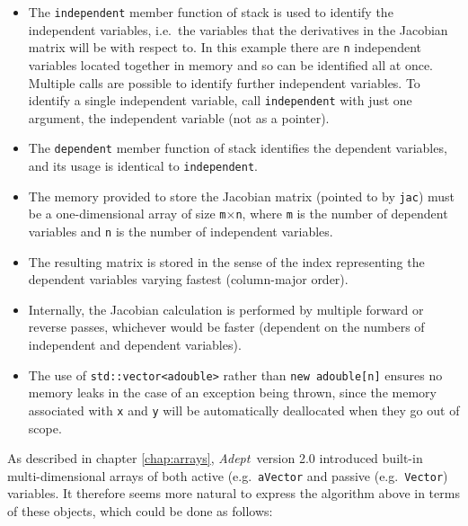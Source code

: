 \documentclass[a4,oneside]{book}
\def\codesize{\small}
\def\Adept{\emph{Adept}}
\def\code#1{{\codesize\texttt{#1}}}
\begin{document}
\begin{itemize}
\item The \code{independent} member function of stack is used to
  identify the independent variables, i.e.\ the variables that the
  derivatives in the Jacobian matrix will be with respect to. In this
  example there are \code{n} independent variables located together in
  memory and so can be identified all at once. Multiple calls are
  possible to identify further independent variables.  To identify a
  single independent variable, call \code{independent} with just one
  argument, the independent variable (not as a pointer). 
\item The \code{dependent} member function of stack identifies the
  dependent variables, and its usage is identical to
  \code{independent}.
\item The memory provided to store the Jacobian matrix (pointed to by
  \code{jac}) must be a one-dimensional array of size
  \code{m}$\times$\code{n}, where \code{m} is the number of dependent
  variables and \code{n} is the number of independent variables.
\item The resulting matrix is stored in the sense of the index
  representing the dependent variables varying fastest (column-major
  order).
\item Internally, the Jacobian calculation is performed by multiple
  forward or reverse passes, whichever would be faster (dependent on
  the numbers of independent and dependent variables).
\item The use of \code{std::vector<adouble>} rather than \code{new
  adouble[n]} ensures no memory leaks in the case of an exception being
  thrown, since the memory associated with \code{x} and \code{y} will
  be automatically deallocated when they go out of scope.
\end{itemize}%

As described in chapter \ref{chap:arrays}, \Adept\ version 2.0
introduced built-in multi-dimensional arrays of both active
(e.g.\ \code{aVector} and passive (e.g.\ \code{Vector}) variables. It
therefore seems more natural to express the algorithm above in terms
of these objects, which could be done as follows:
\end{document}
